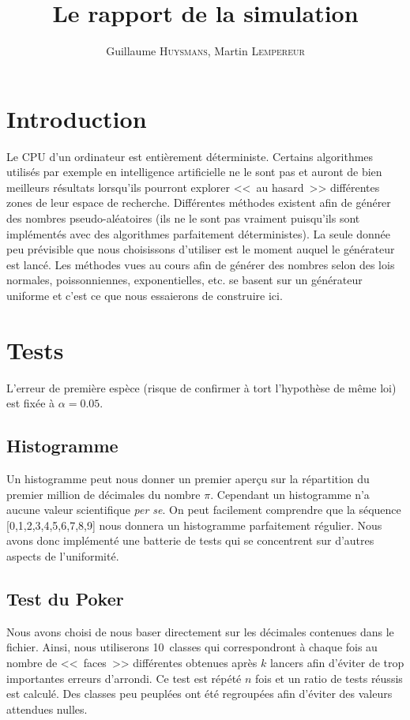 \documentclass[12pt,a4paper]{article}
\author{Guillaume \textsc{Huysmans}, Martin \textsc{Lempereur}}
\title{Le rapport de la simulation}
\begin{document}
\maketitle

\section{Introduction}
Le CPU d'un ordinateur est entièrement déterministe. Certains algorithmes
utilisés par exemple en intelligence artificielle ne le sont pas et auront de
bien meilleurs résultats lorsqu'ils pourront explorer <<~au hasard~>> différentes
zones de leur espace de recherche. Différentes méthodes existent afin de générer
des nombres pseudo-aléatoires (ils ne le sont pas vraiment puisqu'ils sont
implémentés avec des algorithmes parfaitement déterministes). La seule donnée
peu prévisible que nous choisissons d'utiliser est le moment auquel le générateur
est lancé.
Les méthodes vues au cours afin de générer des nombres selon des lois normales,
poissonniennes, exponentielles, etc. se basent sur un générateur uniforme et
c'est ce que nous essaierons de construire ici. 

\section{Tests}
L'erreur de première espèce (risque de confirmer à tort l'hypothèse de même loi)
est fixée à $\alpha=0.05$.

\subsection{Histogramme}
Un histogramme peut nous donner un premier aperçu sur la répartition
du premier million de décimales du nombre $\pi$.
Cependant un histogramme n'a aucune valeur scientifique \textit{per se}. 
On peut facilement comprendre que la séquence [0,1,2,3,4,5,6,7,8,9]
nous donnera un histogramme parfaitement régulier.
Nous avons donc implémenté une batterie de tests qui se concentrent sur d'autres aspects de l'uniformité.


\subsection{Test du Poker}
Nous avons choisi de nous baser directement sur les décimales contenues
dans le fichier. Ainsi, nous utiliserons 10~classes qui correspondront
à chaque fois au nombre de <<~faces~>> différentes obtenues
après $k$ lancers afin d'éviter de trop importantes erreurs d'arrondi.
Ce test est répété $n$ fois et un ratio de tests réussis est calculé.
Des classes peu peuplées ont été regroupées afin d'éviter
des valeurs attendues nulles.
\end{document}
